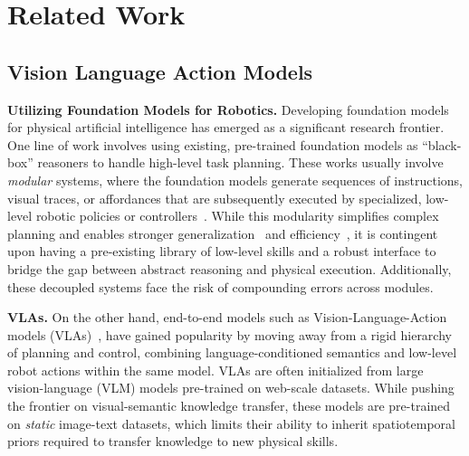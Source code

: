 \documentclass[10pt,logo,copyright]{nvidiatechreport}
\begin{document}
\section{Related Work}
\label{sec:related}
\subsection{Vision Language Action Models}
\textbf{Utilizing Foundation Models for Robotics.} Developing foundation models~\citep{bommasani2021opportunities} for physical artificial intelligence has emerged as a significant research frontier. One line of work involves using existing, pre-trained foundation models as ``black-box'' reasoners to handle high-level task planning. These works usually involve \textit{modular} systems, where the foundation models generate sequences of instructions, visual traces, or affordances that are subsequently executed by specialized, low-level robotic policies or controllers~\citep{saycan-2022,innermono-2022,progprompt-2022,driess2023palm, huang2023voxposer, 11361071}. While this modularity simplifies complex planning and enables stronger generalization~\citep{li2025hamster, lee2025molmoact, kaelbling1} and efficiency~\citep{dreczkowski2025learning}, it is contingent upon having a pre-existing library of low-level skills and a robust interface to bridge the gap between abstract reasoning and physical execution. Additionally, these decoupled systems face the risk of compounding errors across modules.

\textbf{VLAs.} On the other hand, end-to-end models such as Vision-Language-Action models (VLAs)~\citep{rt1-2022, rt22023arxiv, kim24openvla, zheng2025tracevla, ye2025latent, yang2025magma, black2024pi_0, bjorck2025gr00t, intelligence2025pi, team2025gemini, bu2025univla}, have gained popularity by moving away from a rigid hierarchy of planning and control, combining language-conditioned semantics and low-level robot actions within the same model. VLAs are often initialized from large vision-language (VLM) models pre-trained on web-scale datasets. While pushing the frontier on visual-semantic knowledge transfer, these models are pre-trained on \textit{static} image-text datasets, which limits their ability to inherit spatiotemporal priors required to transfer knowledge to new physical skills.
\end{document}

